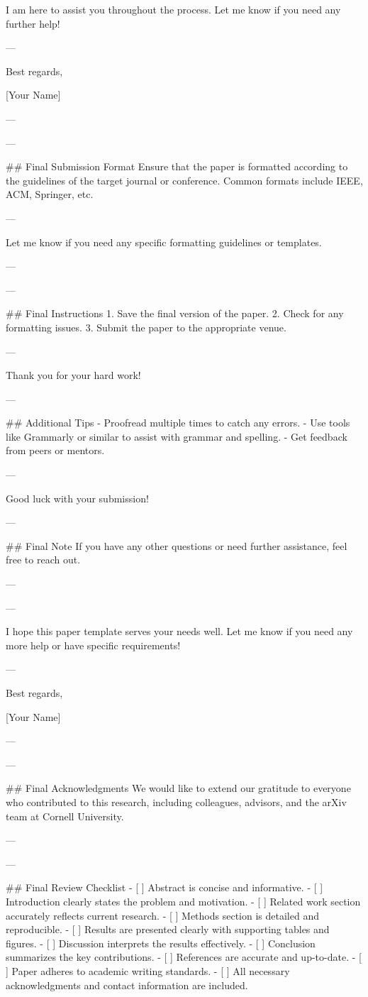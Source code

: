 I am here to assist you throughout the process. Let me know if you need any further help! 

--- 

Best regards, 

[Your Name] 

--- 

---

## Final Submission Format
Ensure that the paper is formatted according to the guidelines of the target journal or conference. Common formats include IEEE, ACM, Springer, etc.

--- 

Let me know if you need any specific formatting guidelines or templates. 

--- 

---

## Final Instructions
1. Save the final version of the paper.
2. Check for any formatting issues.
3. Submit the paper to the appropriate venue.

--- 

Thank you for your hard work! 

--- 

## Additional Tips
- Proofread multiple times to catch any errors.
- Use tools like Grammarly or similar to assist with grammar and spelling.
- Get feedback from peers or mentors.

--- 

Good luck with your submission! 

--- 

## Final Note
If you have any other questions or need further assistance, feel free to reach out. 

--- 

---

I hope this paper template serves your needs well. Let me know if you need any more help or have specific requirements! 

--- 

Best regards, 

[Your Name] 

--- 

---

## Final Acknowledgments
We would like to extend our gratitude to everyone who contributed to this research, including colleagues, advisors, and the arXiv team at Cornell University. 

--- 

---

## Final Review Checklist
- [ ] Abstract is concise and informative.
- [ ] Introduction clearly states the problem and motivation.
- [ ] Related work section accurately reflects current research.
- [ ] Methods section is detailed and reproducible.
- [ ] Results are presented clearly with supporting tables and figures.
- [ ] Discussion interprets the results effectively.
- [ ] Conclusion summarizes the key contributions.
- [ ] References are accurate and up-to-date.
- [ ] Paper adheres to academic writing standards.
- [ ] All necessary acknowledgments and contact information are included.

